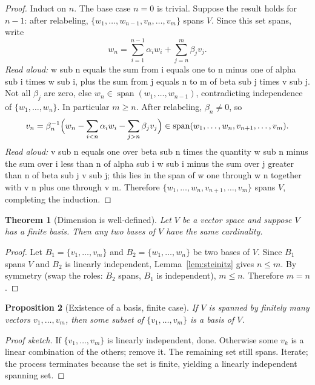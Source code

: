 \documentclass[11pt]{article}
\newtheorem{theorem}{Theorem}
\newtheorem{proposition}[theorem]{Proposition}
\theoremstyle{definition}
\begin{document}
\begin{proof}
Induct on $n$. The base case $n = 0$ is trivial. Suppose the result holds for $n - 1$: after relabeling, $\{w_1, \dots, w_{n-1}, v_n, \dots, v_m\}$ spans $V$. Since this set spans, write
\[
w_n = \sum_{i=1}^{n-1} \alpha_i w_i + \sum_{j=n}^{m} \beta_j v_j.
\]
\emph{Read aloud:} w sub n equals the sum from i equals one to n minus one of alpha sub i times w sub i, plus the sum from j equals n to m of beta sub j times v sub j.
Not all $\beta_j$ are zero, else $w_n \in \operatorname{span}(w_1, \dots, w_{n-1})$, contradicting independence of $\{w_1, \dots, w_n\}$. In particular $m \ge n$. After relabeling, $\beta_n \ne 0$, so
\[
v_n = \beta_n^{-1}\Bigl(w_n - \sum_{i < n} \alpha_i w_i - \sum_{j > n} \beta_j v_j\Bigr) \in \operatorname{span}(w_1, \dots, w_n, v_{n+1}, \dots, v_m).
\]
\emph{Read aloud:} v sub n equals one over beta sub n times the quantity w sub n minus the sum over i less than n of alpha sub i w sub i minus the sum over j greater than n of beta sub j v sub j; this lies in the span of w one through w n together with v n plus one through v m.
Therefore $\{w_1, \dots, w_n, v_{n+1}, \dots, v_m\}$ spans $V$, completing the induction.
\end{proof}

\begin{theorem}[Dimension is well-defined]\label{thm:dim}
Let $V$ be a vector space and suppose $V$ has a finite basis. Then any two bases of $V$ have the same cardinality.
\end{theorem}

\begin{proof}
Let $B_1 = \{v_1, \dots, v_m\}$ and $B_2 = \{w_1, \dots, w_n\}$ be two bases of $V$. Since $B_1$ spans $V$ and $B_2$ is linearly independent, Lemma~\ref{lem:steinitz} gives $n \le m$. By symmetry (swap the roles: $B_2$ spans, $B_1$ is independent), $m \le n$. Therefore $m = n$.
\end{proof}

\begin{proposition}[Existence of a basis, finite case]
If $V$ is spanned by finitely many vectors $v_1, \dots, v_m$, then some subset of $\{v_1, \dots, v_m\}$ is a basis of $V$.
\end{proposition}

\begin{proof}[Proof sketch]
If $\{v_1, \dots, v_m\}$ is linearly independent, done. Otherwise some $v_k$ is a linear combination of the others; remove it. The remaining set still spans. Iterate; the process terminates because the set is finite, yielding a linearly independent spanning set.
\end{proof}
\end{document}
